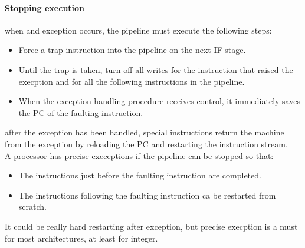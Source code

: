 \documentclass[12pt]{article}
\begin{document}
\paragraph{Stopping execution} when and exception occurs, the pipeline must execute the following steps:
\begin{itemize}
  \item Force a trap instruction into the pipeline on the next IF stage.
  \item Until the trap is taken, turn off all writes for the instruction that raised the execption and for all the following instructions in the pipeline.
  \item When the exception-handling procedure receives control, it immediately saves the PC of the faulting instruction.
\end{itemize}
after the exception has been handled, special instructions return the machine from the exception by reloading the PC and restarting the instruction stream.\\
A processor has precise execeptions if the pipeline can be stopped so that:
\begin{itemize}
  \item The instructions just before the faulting instruction are completed.
  \item The instructions following the faulting instruction ca be restarted from scratch.
\end{itemize}
It could be really hard restarting after exception, but precise execption is a must for most architectures, at least for integer.
\end{document}

